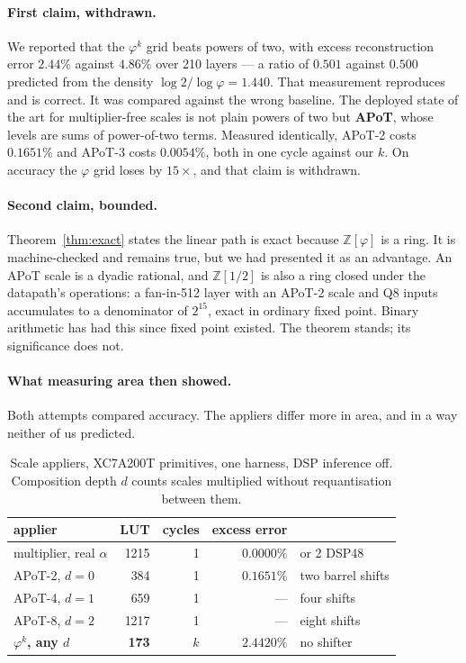 \documentclass[11pt]{article}
\theoremstyle{definition}
\begin{document}
\paragraph{First claim, withdrawn.} We reported that the $\varphi^{k}$ grid beats
powers of two, with excess reconstruction error $2.44\%$ against $4.86\%$ over 210
layers --- a ratio of $0.501$ against $0.500$ predicted from the density
$\log 2 / \log\varphi = 1.440$. That measurement reproduces and is correct. It was
compared against the wrong baseline. The deployed state of the art for
multiplier-free scales is not plain powers of two but \textbf{APoT}, whose levels
are sums of power-of-two terms. Measured identically, APoT-2 costs $0.1651\%$ and
APoT-3 costs $0.0054\%$, both in one cycle against our $k$. On accuracy the
$\varphi$ grid loses by $15\times$, and that claim is withdrawn.

\paragraph{Second claim, bounded.} Theorem~\ref{thm:exact} states the linear path
is exact because $\mathbb{Z}[\varphi]$ is a ring. It is machine-checked and
remains true, but we had presented it as an advantage. An APoT scale is a dyadic
rational, and $\mathbb{Z}[1/2]$ is also a ring closed under the datapath's
operations: a fan-in-512 layer with an APoT-2 scale and Q8 inputs accumulates to a
denominator of $2^{15}$, exact in ordinary fixed point. Binary arithmetic has had
this since fixed point existed. The theorem stands; its significance does not.

\paragraph{What measuring area then showed.} Both attempts compared accuracy. The
appliers differ more in area, and in a way neither of us predicted.

\begin{table}[t]\centering
\caption{Scale appliers, XC7A200T primitives, one harness, DSP inference off.
Composition depth $d$ counts scales multiplied without requantisation between
them.}
\label{tab:scalefrontier}
\begin{tabular}{lrrrl}
\toprule
applier & LUT & cycles & excess error & \\
\midrule
multiplier, real $\alpha$ & 1215 & 1 & $0.0000\%$ & or 2 DSP48 \\
APoT-2, $d=0$ & 384 & 1 & $0.1651\%$ & two barrel shifts \\
APoT-4, $d=1$ & 659 & 1 & --- & four shifts \\
APoT-8, $d=2$ & 1217 & 1 & --- & eight shifts \\
\textbf{$\varphi^{k}$, any $d$} & \textbf{173} & $k$ & $2.4420\%$ & no shifter \\
\bottomrule
\end{tabular}
\end{table}
\end{document}
